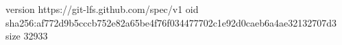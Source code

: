 version https://git-lfs.github.com/spec/v1
oid sha256:af772d9b5cccb752e82a65be4f76f034477702c1e92d0caeb6a4ae32132707d3
size 32933
